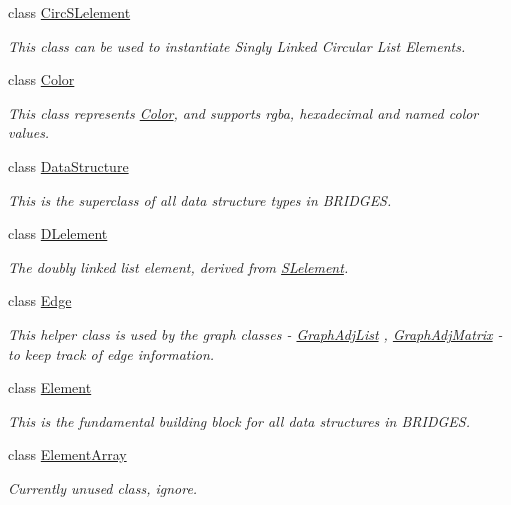 \begin{DoxyCompactItemize}
class \mbox{\hyperlink{classbridges_1_1_circ_s_lelement}{Circ\+S\+Lelement}}
\begin{DoxyCompactList}\small\item\em This class can be used to instantiate Singly Linked Circular List Elements. \end{DoxyCompactList}\item 
class \mbox{\hyperlink{classbridges_1_1_color}{Color}}
\begin{DoxyCompactList}\small\item\em This class represents \mbox{\hyperlink{classbridges_1_1_color}{Color}}, and supports rgba, hexadecimal and named color values. \end{DoxyCompactList}\item 
class \mbox{\hyperlink{classbridges_1_1_data_structure}{Data\+Structure}}
\begin{DoxyCompactList}\small\item\em This is the superclass of all data structure types in B\+R\+I\+D\+G\+ES. \end{DoxyCompactList}\item 
class \mbox{\hyperlink{classbridges_1_1_d_lelement}{D\+Lelement}}
\begin{DoxyCompactList}\small\item\em The doubly linked list element, derived from \mbox{\hyperlink{classbridges_1_1_s_lelement}{S\+Lelement}}. \end{DoxyCompactList}\item 
class \mbox{\hyperlink{classbridges_1_1_edge}{Edge}}
\begin{DoxyCompactList}\small\item\em This helper class is used by the graph classes -\/ \mbox{\hyperlink{classbridges_1_1_graph_adj_list}{Graph\+Adj\+List}} , \mbox{\hyperlink{classbridges_1_1_graph_adj_matrix}{Graph\+Adj\+Matrix}} -\/ to keep track of edge information. \end{DoxyCompactList}\item 
class \mbox{\hyperlink{classbridges_1_1_element}{Element}}
\begin{DoxyCompactList}\small\item\em This is the fundamental building block for all data structures in B\+R\+I\+D\+G\+ES. \end{DoxyCompactList}\item 
class \mbox{\hyperlink{classbridges_1_1_element_array}{Element\+Array}}
\begin{DoxyCompactList}\small\item\em Currently unused class, ignore. \end{DoxyCompactList}\item 

\end{DoxyCompactItemize}
